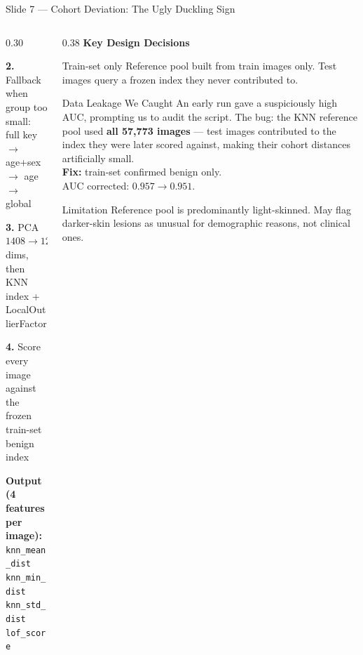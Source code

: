 \documentclass[aspectratio=169, 9pt]{beamer}
\begin{document}
\begin{frame}{Slide 7 --- Cohort Deviation: The Ugly Duckling Sign}
\begin{columns}[T]
\begin{column}{0.30\textwidth}
{      \vspace{0.3em}
      \textbf{2.} Fallback when group too small:\\
      \quad full key $\to$ age+sex $\to$ age $\to$ global

      \vspace{0.3em}
      \textbf{3.} PCA $1408 \to 128$ dims, then\\
      \quad KNN index + LocalOutlierFactor

      \vspace{0.3em}
      \textbf{4.} Score every image against the\\
      \quad frozen train-set benign index

      \vspace{0.3em}
      \textbf{Output (4 features per image):}\\
      \quad \texttt{knn\_mean\_dist} \quad \texttt{knn\_min\_dist}\\
      \quad \texttt{knn\_std\_dist} \quad \texttt{lof\_score}
      }
    \end{column}

    \begin{column}{0.38\textwidth}
      \textbf{\color{navyblue}Key Design Decisions}

      \vspace{0.2em}
      \begin{block}{Train-set only}
        \scriptsize Reference pool built from train images only.
        Test images query a frozen index they never contributed to.
      \end{block}

      \vspace{0.2em}
      \begin{alertblock}{Data Leakage We Caught}
        \scriptsize
        An early run gave a suspiciously high AUC, prompting us to
        audit the script. The bug: the KNN reference pool used
        \textbf{all 57,773 images} --- test images contributed to
        the index they were later scored against, making their
        cohort distances artificially small.\\[0.2em]
        \textbf{Fix:} train-set confirmed benign only.\\
        AUC corrected: $0.957 \to 0.951$.
      \end{alertblock}

      \vspace{0.2em}
      \begin{alertblock}{Limitation}
        \scriptsize Reference pool is predominantly light-skinned.
        May flag darker-skin lesions as unusual for demographic
        reasons, not clinical ones.
      \end{alertblock}

    \end{column}

  \end{columns}
\end{frame}
\end{document}
